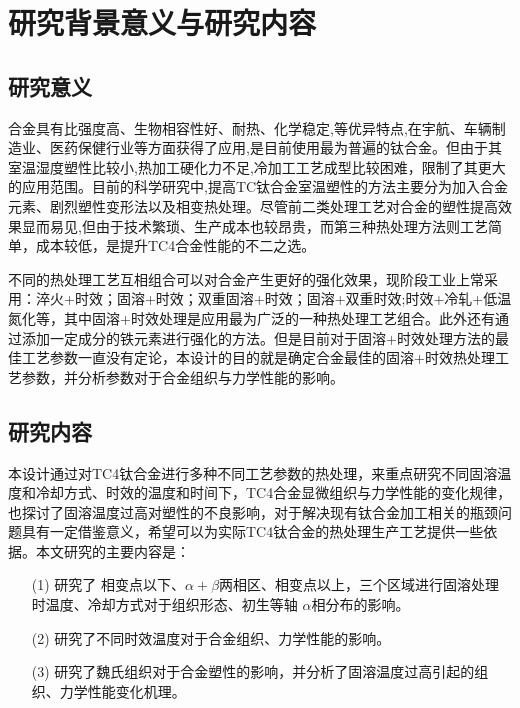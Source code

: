 \section{研究背景意义与研究内容}
\subsection{研究意义}
\ti 合金具有比强度高、生物相容性好、耐热、化学稳定,等优异特点,在宇航、车辆制造业、医药保健行业等方面获得了应用,是目前使用最为普遍的钛合金。但由于其室温湿度塑性比较小,热加工硬化力不足,冷加工工艺成型比较困难，限制了其更大的应用范围。目前的科学研究中,提高TC钛合金室温塑性的方法主要分为加入合金元素、剧烈塑性变形法以及相变热处理。尽管前二类处理工艺对合金的塑性提高效果显而易见,但由于技术繁琐、生产成本也较昂贵\cite{miao}，而第三种热处理方法则工艺简单，成本较低，是提升TC4合金性能的不二之选。

不同的热处理工艺互相组合可以对合金产生更好的强化效果，现阶段工业上常采用\cite{zhoukaixiangJiyushenlengchulidenanjiagongcailiaoqiexiaotexingyanjiu2022}：淬火+时效；固溶+时效；双重固溶+时效；固溶+双重时效;时效+冷轧+低温氮化等，其中固溶+时效处理是应用最为广泛的一种热处理工艺组合。此外还有通过添加一定成分的铁元素进行强化的方法\cite{yuliaoMicrostructuralStrengtheningToughening2022}。但是目前对于固溶+时效处理方法的最佳工艺参数一直没有定论，本设计的目的就是确定\ti 合金最佳的固溶+时效热处理工艺参数，并分析参数对于合金组织与力学性能的影响。

\subsection{研究内容}
本设计通过对TC4钛合金进行多种不同工艺参数的热处理，来重点研究不同固溶温度和冷却方式、时效的温度和时间下，TC4合金显微组织与力学性能的变化规律，也探讨了固溶温度过高对塑性的不良影响，对于解决现有钛合金加工相关的瓶颈问题具有一定借鉴意义，希望可以为实际TC4钛合金的热处理生产工艺提供一些依据。本文研究的主要内容是：
\begin{enumerate}[itemindent=1em]
	\item[(1)] 研究了 相变点以下、$ \alpha+\beta $两相区、相变点以上，三个区域进行固溶处理时温度、冷却方式对于组织形态、初生等轴 $ \alpha $相分布的影响。
	\item[(2)] 研究了不同时效温度对于合金组织、力学性能的影响。
	\item[(3)] 研究了魏氏组织对于合金塑性的影响，并分析了固溶温度过高引起的组织、力学性能变化机理。
\end{enumerate}

